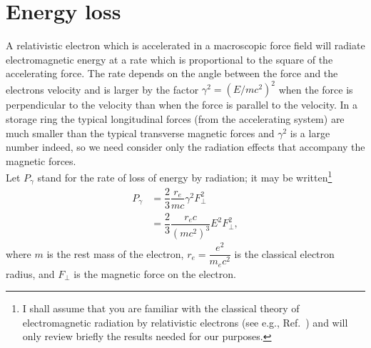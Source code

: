 \section{Energy loss}\label{sec:4.1}

A relativistic electron which is accelerated in a macroscopic force field will radiate electromagnetic energy at a rate which is proportional to the square of the accelerating
 force. The rate depends on the angle between the force and the electrons velocity and is larger by the factor $\gamma^2 = (E/mc^2)^2$ when the force is perpendicular to the velocity than when the force is parallel to the velocity. In a storage ring the typical longitudinal forces (from the accelerating system) are much smaller than the typical transverse magnetic forces and $\gamma^2$ is a large number indeed, so we need consider only the radiation effects that accompany the magnetic forces.\\
Let $P_\gamma$ stand for the rate of loss of energy by radiation; it may be written\footnote{I shall assume that you are familiar with the classical theory of electromagnetic radiation by relativistic electrons (see e.g., Ref.~\cite{10}) and will only review briefly the results needed for our purposes.}
\begin{align}
	P_\gamma &= \dfrac{2}{3} \dfrac{r_e}{m c} \gamma^2 F_\perp^2 \nonumber \\
    	&= \dfrac{2}{3} \dfrac{r_e c}{(m c^2)^3} E^2 F_\perp^2,
\end{align}
where $m$ is the rest mass of the electron, $r_e = \dfrac{e^2}{m_e c^2}$ is the classical electron radius, and $F_\perp$ is the magnetic force on the electron.

